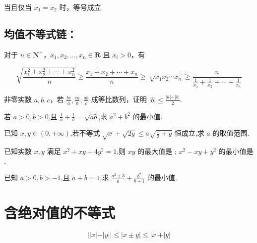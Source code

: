 \documentclass[a4paper , final]{ctexart}
\newenvironment{problem}[1]{%
  \item #1
  \par
  \vspace{8cm}
}{}
\begin{document}
当且仅当 $x_1=x_2$ 时，等号成立.

\subsection*{均值不等式链：}

对于 $n\in\mathbf{N}^+$，$x_1,x_2,\ldots,x_n\in\mathbf{R}$ 且 $x_i>0$，有

$$
  \sqrt{\frac{x_1^2+x_2^2+\cdots+x_n^2}{n}} \geq \frac{x_1+x_2+\cdots+x_n}{n} \geq \sqrt[n]{x_1x_2\cdots x_n}\geq \frac{n}{\frac{1}{x_1}+\frac{1}{x_2}+\cdots+\frac{1}{x_n}}
$$

\begin{problems}
  \begin{problem}
  {
  非零实数 $a,b,c$，若 $\frac{bc}{a},\frac{ca}{b},\frac{ab}{c}$ 成等比数列，证明 $\vert b\vert\leq \frac{\vert a \vert +\vert b\vert}{2}$.
  }
  \end{problem}

  \begin{problem}
  {
  若 $a>0,b>0$,且 $\frac{1}{a}+\frac{1}{b} =\sqrt{ab}$,求 $a^2+b^2$ 的最小值.
  }
  \end{problem}

  \begin{problem}
  {
  已知 $x,y\in(0,+\infty)$,若不等式 $\sqrt{x}+\sqrt{2y}\leq a\sqrt{\frac{x}{2}+y}$ 恒成立,求 $a$ 的取值范围.
  }
  \end{problem}

  \begin{problem}
  {
  已知实数 $x,y$ 满足 $x^2+xy+4y^2=1$,则 $xy$ 的最大值是 \underline{\hspace{2cm}}; $x^2-xy+y^2$ 的最小值是 \underline{\hspace{2cm}}.
  }
  \end{problem}

  \begin{problem}
  {
  已知 $a>0,b>-1$,且 $a+b=1$,求 $\frac{a^2+3}{a}+\frac{b^2}{b+1}$ 的最小值.
  }
  \end{problem}
\end{problems}

\newpage
\section*{含绝对值的不等式}

$$
  \vert \vert x\vert -\vert y\vert \vert \leq \vert x\pm y \vert \leq\vert x\vert +\vert y\vert
$$
\end{document}
